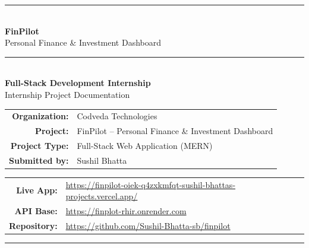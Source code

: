 \documentclass[11pt,a4paper]{report}
\begin{document}
\begin{titlepage}
  \thispagestyle{empty}
  \begin{center}
    \vspace*{0.6cm}

    {\color{brandaccent}\rule{\linewidth}{2pt}}\\[0.4cm]
    {\Huge\bfseries\color{brandprimary} FinPilot}\\[0.35cm]
    {\LARGE\color{brandprimary} Personal Finance \& Investment Dashboard}\\[0.30cm]
    {\color{brandaccent}\rule{\linewidth}{2pt}}\\[1.4cm]

    {\Large\bfseries Full-Stack Development Internship}\\[0.5cm]
    {\large Internship Project Documentation}\\[1.6cm]

    \begin{tabular}{rl}
      \textbf{Organization:} & Codveda Technologies \\[0.35cm]
      \textbf{Project:}      & FinPilot -- Personal Finance \& Investment Dashboard \\[0.35cm]
      \textbf{Project Type:} & Full-Stack Web Application (MERN) \\[0.35cm]
      \textbf{Submitted by:} & Sushil Bhatta \\
    \end{tabular}

    \vfill

    \begin{tabular}{rl}
      \textbf{Live App:} & \url{https://finpilot-oiek-q4zxkmfqt-sushil-bhattas-projects.vercel.app/} \\[0.2cm]
      \textbf{API Base:} & \url{https://finplot-rhir.onrender.com} \\[0.2cm]
      \textbf{Repository:} & \url{https://github.com/Sushil-Bhatta-sb/finpilot} \\
    \end{tabular}

    \vspace{1.2cm}
    {\color{brandaccent}\rule{\linewidth}{1pt}}
  \end{center}
\end{titlepage}

\tableofcontents
\clearpage
{}
\end{document}
